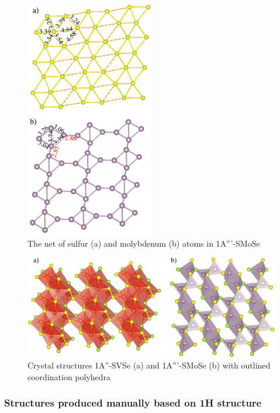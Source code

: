 \documentclass[a4paperm]{article}
\begin{document}
\begin{figure}[H]
	\includegraphics[width=0.5\textwidth]{airss3_smose.png}
	\caption{The net of sulfur (a) and molybdenum (b) atoms in 1A'''-SMoSe }
	\label{airss3_smose}
\end{figure}


\begin{figure}[H]
	\includegraphics[width=\textwidth]{airss3_poly.png}
	\caption{Crystal structures 1A''-SVSe (a) and 1A'''-SMoSe (b) with outlined coordination polyhedra}
	\label{airss3_poly}
\end{figure}




\subsubsection{Structures produced manually based on 1H structure}
\end{document}
